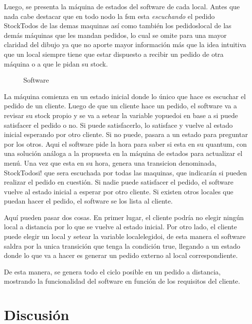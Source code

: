 \documentclass[a4paper,10pt]{article}
\begin{document}
Luego, se presenta la m\'aquina de estados del software de cada local.
Antes que nada cabe destacar que en todo nodo la fsm esta \emph{escuchando} el pedido StockTodos de las demas maquinas as\'i como tambi\'en los pedidoslocal de las dem\'as m\'aquinas que les mandan pedidos, lo cual se omite para una mayor claridad del dibujo ya que no aporte mayor informaci\'on m\'as que la idea intuitiva que un local siempre tiene que estar dispuesto a recibir un pedido de otra m\'aquina o a que le pidan su stock.

\begin{figure}[H]
\centering
{}
\caption{Software}
\end{figure}

La m\'aquina comienza en un estado inicial donde lo \'unico que hace es escuchar el pedido de un cliente. Luego de que un cliente hace un pedido, el software va a revisar su stock propio y se va a setear la variable yopuedoi en base a si puede satisfacer el pedido o no. Si puede satisfacerlo, lo satisface y vuelve al estado inicial esperando por otro cliente. Si no puede, pasara a un estado para preguntar por los otros. Aqui el software pide la hora para saber si esta en su quantum, con una soluci\'on an\'aloga a la propuesta en la m\'aquina de estados para actualizar el men\'u. Una vez que esta en su hora, genera una transicion denominada, StockTodosi! que sera escuchada por todas las maquinas, que indicar\'an si pueden realizar el pedido en cuesti\'on. Si nadie puede satisfacer el pedido, el software vuelve al estado inicial a esperar por otro cliente. Si existen otros locales que puedan hacer el pedido, el software se los lista al cliente.

Aqu\'i pueden pasar dos cosas. En primer lugar, el cliente podr\'ia no elegir ning\'un local a distancia por lo que se vuelve al estado inicial. Por otro lado, el cliente puede elegir un local y setear la variable localelegidoi, de esta manera el software saldra por la unica transici\'on que tenga la condici\'on true, llegando a un estado donde lo que va a hacer es generar un pedido externo al local correspondiente.

De esta manera, se genera todo el ciclo posible en un pedido a distancia, mostrando la funcionalidad del software en funci\'on de los requisitos del cliente.




\newpage


\section*{Discusi\'on}
\end{document}
